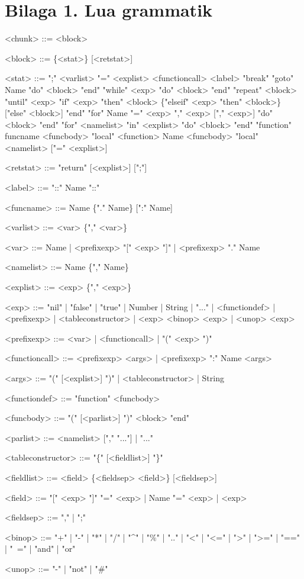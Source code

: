 \section*{Bilaga 1. Lua grammatik}

\begin{grammar}
  \singlespace\small%
  \selectfont

  <chunk> ::= <block>

  <block> ::= \{<stat>\} [<retstat>]

  <stat> ::=  ";"
     \alt <varlist> "=" <explist>
     \alt <functioncall>
     \alt <label>
     \alt "break"
     \alt "goto" Name
     \alt "do" <block> "end"
     \alt "while" <exp> "do" <block> "end"
     \alt "repeat" <block> "until" <exp>
     \alt "if" <exp> "then" <block> \{"elseif" <exp> "then" <block>\} ["else" <block>] "end"
     \alt "for" Name "=" <exp> "," <exp> ["," <exp>] "do" <block> "end"
     \alt "for" <namelist> "in" <explist> "do" <block> "end"
     \alt "function" funcname <funcbody>
     \alt "local" <function> Name <funcbody>
     \alt "local" <namelist> ["=" <explist>]

  <retstat> ::= "return" [<explist>] [";"]

  <label> ::= "::" Name "::"

  <funcname> ::= Name \{"." Name\} [":" Name]

  <varlist> ::= <var> \{"," <var>\}

  <var> ::= Name | <prefixexp> "[" <exp> "]" | <prefixexp> "." Name

  <namelist> ::= Name \{"," Name\}

  <explist> ::= <exp> \{"," <exp>\}

  <exp> ::=  "nil" | "false" | "true" | Number | String | "..." | <functiondef> |
     <prefixexp> | <tableconstructor> | <exp> <binop> <exp> | <unop> <exp>

  <prefixexp> ::= <var> | <functioncall> | "(" <exp> ")"

  <functioncall> ::=  <prefixexp> <args> | <prefixexp> ":" Name <args>

  <args> ::=  "(" [<explist>] ")" | <tableconstructor> | String

  <functiondef> ::= "function" <funcbody>

  <funcbody> ::= "(" [<parlist>] ")" <block> "end"

  <parlist> ::= <namelist> ["," "..."] | "..."

  <tableconstructor> ::= "\{" [<fieldlist>] "\}"

  <fieldlist> ::= <field> \{<fieldsep> <field>\} [<fieldsep>]

  <field> ::= "[" <exp> "]" "=" <exp> | Name "=" <exp> | <exp>

  <fieldsep> ::= "," | ";"

  <binop> ::= "+" | "-" | "*" | "/" | "\textasciicircum" | "\%" | ".." |
     "<" | "<=" | ">" | ">=" | "==" | "~=" |
     "and" | "or"

  <unop> ::= "-" | "not" | "\#"
\end{grammar}
